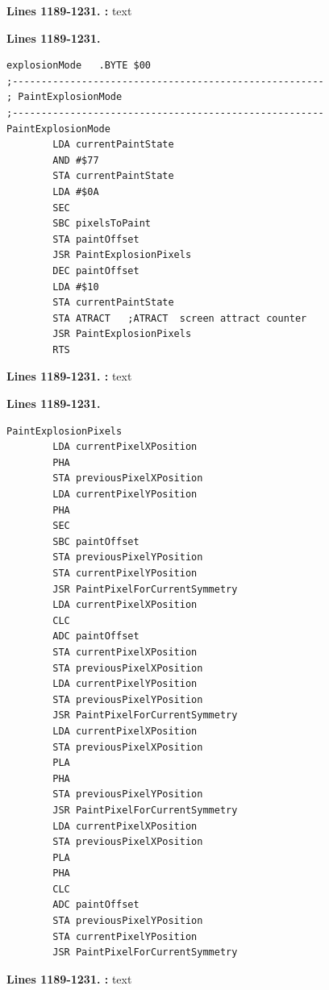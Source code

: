 \clearpage

\textbf{Lines 1189-1231. :} 
text

\clearpage
\textbf{Lines 1189-1231. } 
\begin{lstlisting}
explosionMode   .BYTE $00
;------------------------------------------------------
; PaintExplosionMode
;------------------------------------------------------
PaintExplosionMode
        LDA currentPaintState
        AND #$77
        STA currentPaintState
        LDA #$0A
        SEC 
        SBC pixelsToPaint
        STA paintOffset
        JSR PaintExplosionPixels
        DEC paintOffset
        LDA #$10
        STA currentPaintState
        STA ATRACT   ;ATRACT  screen attract counter
        JSR PaintExplosionPixels
        RTS 

\end{lstlisting}

\clearpage

\textbf{Lines 1189-1231. :} 
text
\clearpage



\textbf{Lines 1189-1231. } 
\begin{lstlisting}
PaintExplosionPixels
        LDA currentPixelXPosition
        PHA 
        STA previousPixelXPosition
        LDA currentPixelYPosition
        PHA 
        SEC 
        SBC paintOffset
        STA previousPixelYPosition
        STA currentPixelYPosition
        JSR PaintPixelForCurrentSymmetry
        LDA currentPixelXPosition
        CLC 
        ADC paintOffset
        STA currentPixelXPosition
        STA previousPixelXPosition
        LDA currentPixelYPosition
        STA previousPixelYPosition
        JSR PaintPixelForCurrentSymmetry
        LDA currentPixelXPosition
        STA previousPixelXPosition
        PLA 
        PHA 
        STA previousPixelYPosition
        JSR PaintPixelForCurrentSymmetry
        LDA currentPixelXPosition
        STA previousPixelXPosition
        PLA 
        PHA 
        CLC 
        ADC paintOffset
        STA previousPixelYPosition
        STA currentPixelYPosition
        JSR PaintPixelForCurrentSymmetry

\end{lstlisting}

\clearpage

\textbf{Lines 1189-1231. :} 
text
\clearpage



